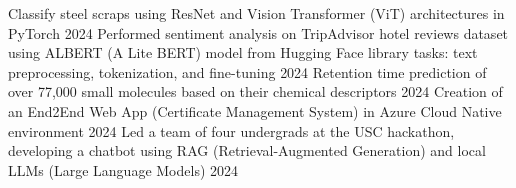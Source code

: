 

\begin{cvhonors}
\cvhonor
    {Classify steel scraps using ResNet and Vision Transformer (ViT) architectures in PyTorch} %
    {} %
    {} %
    {2024} %
\cvhonor
    {Performed sentiment analysis on TripAdvisor hotel reviews dataset using ALBERT (A Lite BERT) model from Hugging Face library} %
    {tasks: text preprocessing, tokenization, and fine-tuning} %
    {} %
    {2024} %
\cvhonor
    {Retention time prediction of over 77,000 small molecules based on their chemical descriptors} %
    {} %
    {} %
    {2024} %
\cvhonor
    {Creation of an End2End Web App (Certificate Management System) in Azure Cloud Native environment} %
    {} %
    {} %
    {2024} %
\cvhonor
    {Led a team of four undergrads at the USC hackathon, developing a chatbot using RAG (Retrieval-Augmented Generation) and local LLMs (Large Language Models)} %
    {} %
    {} %
    {2024} %
\end{cvhonors}

